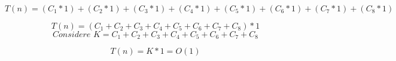 \begin{equation}
T(n)=({C_1}*1)+({C_2}*1)+({C_3}*1)+({C_4}*1)+({C_5}*1)+({C_6}*1)+({C_7}*1)+({C_8}*1)
\end{equation}

\begin{equation}T(n)=({C_1}+{C_2}+{C_3}+{C_4}+{C_5}+{C_6}+{C_7}+{C_8})*1\end{equation}
\begin{equation}\textit{Considere K} = {C_1}+{C_2}+{C_3}+{C_4}+{C_5}+{C_6}+{C_7}+{C_8}\end{equation}

\begin{equation}
    T(n)= K*1 = O(1)
\end{equation}
\begin{center}
\begin{minipage}{0.5\textwidth}
    
\end{minipage}
\end{center}
\newpage